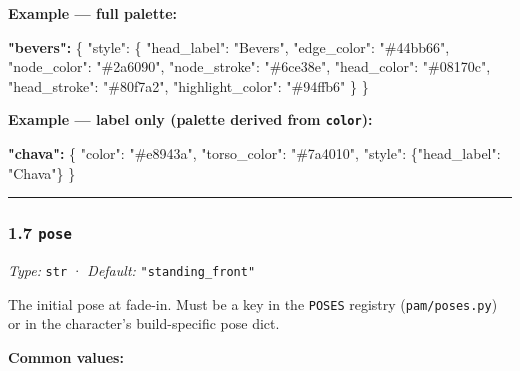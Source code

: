 \documentclass[
  12pt,
  letterpaper,
]{book}
\newenvironment{Shaded}{}{}
\newcommand{\DataTypeTok}[1]{\textcolor[rgb]{0.56,0.13,0.00}{#1}}
\newcommand{\ErrorTok}[1]{\textcolor[rgb]{1.00,0.00,0.00}{\textbf{#1}}}
\newcommand{\FunctionTok}[1]{\textcolor[rgb]{0.02,0.16,0.49}{#1}}
\newcommand{\StringTok}[1]{\textcolor[rgb]{0.25,0.44,0.63}{#1}}
\begin{document}
\textbf{Example --- full palette:}

\begin{Shaded}
\begin{Highlighting}[]
\ErrorTok{"bevers":} \FunctionTok{\{}
  \DataTypeTok{"style"}\FunctionTok{:} \FunctionTok{\{}
    \DataTypeTok{"head\_label"}\FunctionTok{:} \StringTok{"Bevers"}\FunctionTok{,}
    \DataTypeTok{"edge\_color"}\FunctionTok{:} \StringTok{"\#44bb66"}\FunctionTok{,}
    \DataTypeTok{"node\_color"}\FunctionTok{:} \StringTok{"\#2a6090"}\FunctionTok{,}
    \DataTypeTok{"node\_stroke"}\FunctionTok{:} \StringTok{"\#6ce38e"}\FunctionTok{,}
    \DataTypeTok{"head\_color"}\FunctionTok{:} \StringTok{"\#08170c"}\FunctionTok{,}
    \DataTypeTok{"head\_stroke"}\FunctionTok{:} \StringTok{"\#80f7a2"}\FunctionTok{,}
    \DataTypeTok{"highlight\_color"}\FunctionTok{:} \StringTok{"\#94ffb6"}
  \FunctionTok{\}}
\FunctionTok{\}}
\end{Highlighting}
\end{Shaded}

\textbf{Example --- label only (palette derived from \texttt{color}):}

\begin{Shaded}
\begin{Highlighting}[]
\ErrorTok{"chava":} \FunctionTok{\{}
  \DataTypeTok{"color"}\FunctionTok{:} \StringTok{"\#e8943a"}\FunctionTok{,}
  \DataTypeTok{"torso\_color"}\FunctionTok{:} \StringTok{"\#7a4010"}\FunctionTok{,}
  \DataTypeTok{"style"}\FunctionTok{:} \FunctionTok{\{}\DataTypeTok{"head\_label"}\FunctionTok{:} \StringTok{"Chava"}\FunctionTok{\}}
\FunctionTok{\}}
\end{Highlighting}
\end{Shaded}

\begin{center}\rule{0.5\linewidth}{0.5pt}\end{center}

\subsubsection{\texorpdfstring{1.7 \texttt{pose}}{1.7 pose}}\label{pose}

\emph{Type:} \texttt{str} · \emph{Default:} \texttt{"standing\_front"}

The initial pose at fade-in. Must be a key in the \texttt{POSES}
registry (\texttt{pam/poses.py}) or in the character's build-specific
pose dict.

\textbf{Common values:}
\end{document}
